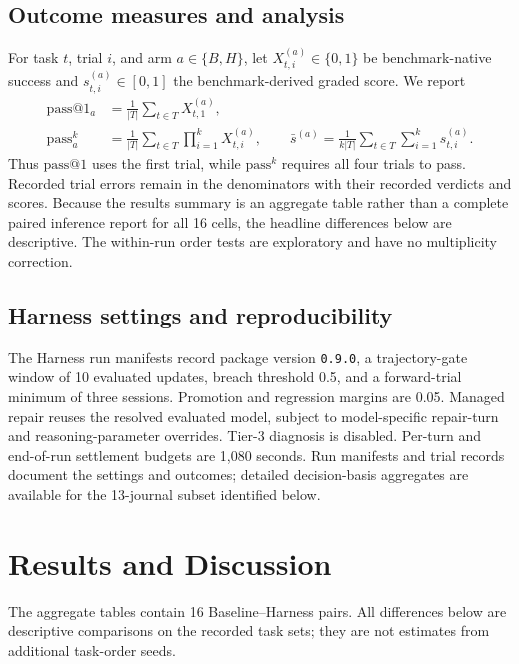 \documentclass[11pt,letterpaper]{article}
\makeatletter
\newcommand{\passk}{\mathrm{pass}^{k}}
\newcommand{\passone}{\mathrm{pass@}1}
\makeatother
\begin{document}
\subsection{Outcome measures and analysis}
\label{sec:estimators}
For task $t$, trial $i$, and arm $a\in\{B,H\}$, let $X^{(a)}_{t,i}\in\{0,1\}$
be benchmark-native success and $s^{(a)}_{t,i}\in[0,1]$ the benchmark-derived
graded score. We report
\begin{align}
 \passone_{a}&=\frac{1}{|T|}\sum_{t\in T}X^{(a)}_{t,1},
 \label{eq:pass1}\\
 \passk_{a}&=\frac{1}{|T|}\sum_{t\in T}\prod_{i=1}^{k}X^{(a)}_{t,i},
 \qquad
 \bar s^{(a)}=\frac{1}{k|T|}\sum_{t\in T}\sum_{i=1}^{k}s^{(a)}_{t,i}.
 \label{eq:passk}
\end{align}
Thus $\passone$ uses the first trial, while $\passk$ requires all four
trials to pass. Recorded trial errors remain in the denominators with
their recorded verdicts and scores. Because the results summary is an
aggregate table rather than a complete paired inference report for all
16 cells, the headline differences below are descriptive. The
within-run order tests are exploratory and have no multiplicity
correction.

\subsection{Harness settings and reproducibility}
\label{sec:checkpoints}
The Harness run manifests record package version \texttt{0.9.0},
a trajectory-gate window of 10 evaluated updates, breach threshold 0.5,
and a forward-trial minimum of three sessions. Promotion and regression
margins are 0.05. Managed repair reuses the resolved evaluated model,
subject to model-specific repair-turn and reasoning-parameter overrides.
Tier-3 diagnosis is disabled. Per-turn and end-of-run settlement budgets
are 1,080 seconds. Run manifests and trial records document the settings
and outcomes; detailed decision-basis aggregates are available for the
13-journal subset identified below.

\section{Results and Discussion}
\label{sec:results}

The aggregate tables contain 16 Baseline--Harness pairs.
All differences below are descriptive comparisons on the recorded task
sets; they are not estimates from additional task-order seeds.
\end{document}
